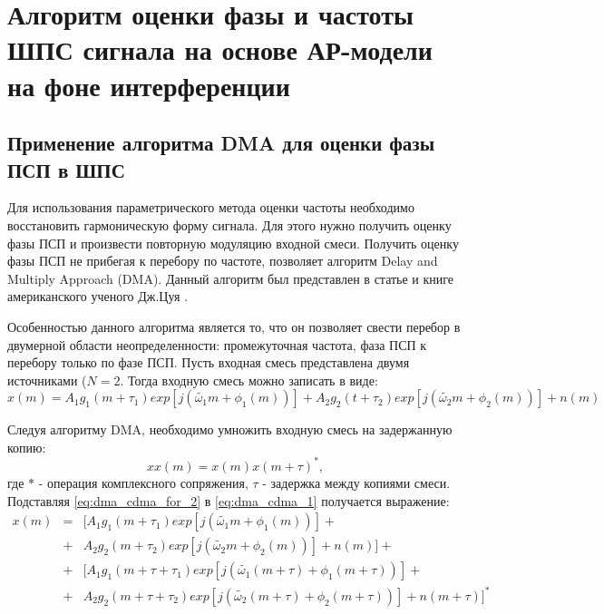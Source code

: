 \chapter{Алгоритм оценки фазы и частоты ШПС сигнала на основе АР-модели на фоне интерференции}

\section{Применение алгоритма DMA для оценки фазы ПСП в ШПС}
\label{sec_dma_real}
Для использования параметрического метода оценки частоты необходимо восстановить гармоническую форму сигнала. Для этого
нужно получить оценку фазы ПСП и произвести повторную модуляцию входной смеси. Получить оценку фазы ПСП не прибегая к перебору по частоте,
позволяет алгоритм Delay and Multiply Approach (DMA). Данный алгоритм был представлен в статье и книге американского ученого Дж.Цуя \cite{lin_dma, tsui}.

Особенностью данного алгоритма является то, что он позволяет свести перебор в двумерной области неопределенности:
промежуточная частота, фаза ПСП к перебору только по фазе ПСП.
Пусть входная смесь представлена двумя источниками (${N=2}$. Тогда входную смесь можно записать в виде:
\begin{equation}
	\label{eq:dma_cdma_for_2}
	x(m) =	A_1 g_1(m + \tau_1) exp \left[ j \left( \tilde{\omega_1} m + \phi_1 (m) \right) \right]
		+ A_2 g_2(t + \tau_2) exp \left[ j \left(  \tilde{\omega_2} m + \phi_2 (m) \right) \right] + n(m) 
\end{equation}

Следуя алгоритму DMA, необходимо умножить входную смесь на задержанную копию:
\begin{equation}
	\label{eq:dma_cdma_1}
	xx(m) = x(m)x(m+\tau)^*,
\end{equation}
где ${*}$ - операция комплексного сопряжения, ${\tau}$ - задержка между копиями смеси. Подставляя \ref{eq:dma_cdma_for_2} в \ref{eq:dma_cdma_1} получается выражение:
\begin{eqnarray}
	\label{eq:dma_cdma_2}
	x(m) & = &[ A_1 g_1(m + \tau_1) exp \left[ j \left( \tilde{\omega_1} m + \phi_1 (m) \right) \right] + \nonumber \\
	     & + & A_2 g_2(m + \tau_2) exp \left[ j \left(  \tilde{\omega_2} m + \phi_2 (m) \right) \right] + n(m) ] + \nonumber \\
	     & + & [A_1 g_1(m + \tau + \tau_1) exp \left[ j \left( \tilde{\omega_1} (m + \tau) + \phi_1 (m + \tau) \right) \right]  + \nonumber \\
	     & + & A_2 g_2(m + \tau + \tau_2) exp \left[ j \left(  \tilde{\omega_2} (m + \tau) + \phi_2 (m + \tau) \right) \right] + n(m + \tau)]^*
\end{eqnarray}

